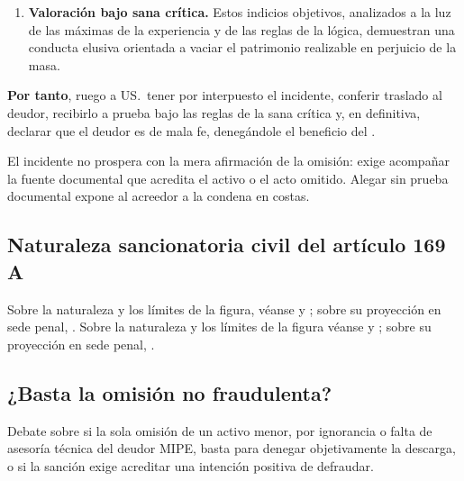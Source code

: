 \begin{escrito}
\begin{enumerate}[leftmargin=1.6em]
  \item \textbf{Valoración bajo sana crítica.} Estos indicios objetivos, analizados a la
  luz de las máximas de la experiencia y de las reglas de la lógica, demuestran una
  conducta elusiva orientada a vaciar el patrimonio realizable en perjuicio de la masa.
\end{enumerate}

\medskip
\noindent\textbf{Por tanto}, ruego a US.\ tener por interpuesto el incidente, conferir
traslado al deudor, recibirlo a prueba bajo las reglas de la sana crítica y, en
definitiva, declarar que el deudor es de mala fe, denegándole el beneficio del
\discharge{}.
\end{escrito}

\begin{alerta}
El incidente no prospera con la mera afirmación de la omisión: exige acompañar la fuente
documental que acredita el activo o el acto omitido. Alegar sin prueba documental expone
al acreedor a la condena en costas.
\end{alerta}

\bloqueJurisprudencial

\subsection{Naturaleza sancionatoria civil del artículo 169 A}
Sobre la naturaleza y los límites de la figura, véanse \textcite{doc-mala-fe-uv} y
\textcite{doc-limites-mala-fe}; sobre su proyección en sede penal,
\textcite{doc-mala-fe-penal}.
Sobre la naturaleza y los límites de la figura véanse \textcite{doc-mala-fe-uv} y
\textcite{doc-limites-mala-fe}; sobre su proyección en sede penal,
\textcite{doc-mala-fe-penal}.

\subsection{¿Basta la omisión no fraudulenta?}

Debate sobre si la sola omisión de un activo menor, por ignorancia o falta de asesoría
técnica del deudor MIPE, basta para denegar objetivamente la descarga, o si la sanción
exige acreditar una intención positiva de defraudar.
